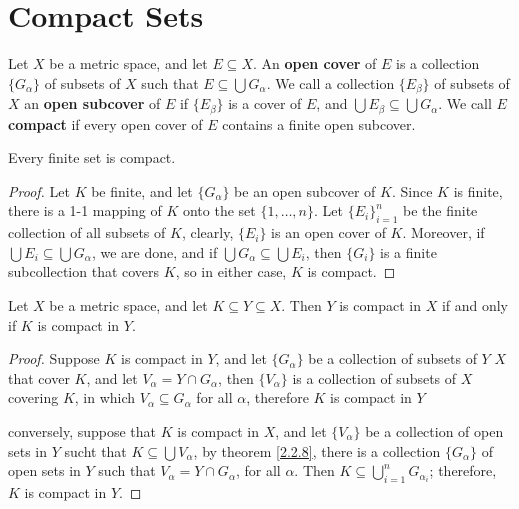
\section{Compact Sets}

\begin{definition}
    Let $X$ be a metric space, and let $E \subseteq X$. An \textbf{open cover} of $E$ 
    is a collection $\{G_{\alpha}\}$ of subsets of  $X$ such that  $E \subseteq \bigcup{G_{\alpha}}$.
    We call a collection  $\{E_{\beta}\}$ of subsets of  $X$ an \textbf{open subcover} of  $E$ 
    if  $\{E_{\beta}\}$ is a cover of  $E$, and  $\bigcup{E_{\beta}} \subseteq \bigcup{G_{\alpha}}$. We call $E$ 
    \textbf{compact} if every open cover of  $E$ contains a finite open subcover.
\end{definition}

\begin{lemma}\label{2.3.1}
    Every finite set is compact.
\end{lemma}
\begin{proof}
    Let $K$ be finite, and let  $\{G_{\alpha}\}$ be an open subcover of  $K$. Since 
    $K$ is finite, there is a 1-1 mapping of  $K$ onto the set  $\{1,\dots, n\}$. Let  
    $\{E_i\}_{i=1}^{n}$	be the finite collection of all subsets of $K$, clearly,  $\{E_i\}$ 
    is an open cover of $K$. Moreover, if  $\bigcup{E_i} \subseteq \bigcup{G_{\alpha}}$, we are done, and 
    if $\bigcup{G_{\alpha}} \subseteq \bigcup{E_i}$, then $\{G_i\}$ is a finite subcollection that 
    covers  $K$, so in either case,  $K$ is compact.
\end{proof}

\begin{theorem}\label{2.3.2}
    Let $X$ be a metric space, and let  $K \subseteq Y \subseteq X$. Then  $Y$ is compact in  $X$ 
    if and only if  $K$ is compact in  $Y$.
\end{theorem}
\begin{proof}
    Suppose $K$ is compact in  $Y$, and let  $\{G_{\alpha}\}$ be a collection of subsets of  $Y$ 
    $X$ that cover  $K$, and let  $V_{\alpha}=Y \cap G_{\alpha}$, then  $\{V_{\alpha}\}$ is 
    a collection of subsets of  $X$ covering  $K$, in which  $V_{\alpha} \subseteq G_{\alpha}$ for 
    all  $\alpha$, therefore  $K$ is compact in $Y$ 
    
    conversely, suppose that $K$ is compact in $X$, and let  $\{V_{\alpha}\}$ be a collection 
    of open sets in  $Y$ sucht that  $K \subseteq \bigcup{V_{\alpha}}$, by theorem \ref{2.2.8}, 
    there is a collection $\{G_{\alpha}\}$ of open sets in  $Y$ such that  $V_{\alpha}=Y \cap G_{\alpha}$, 
    for all  $\alpha$. Then  $K \subseteq \bigcup_{i=1}^{n}{G_{\alpha_i}}$; therefore,  $K$ is compact in  $Y$.
\end{proof}

